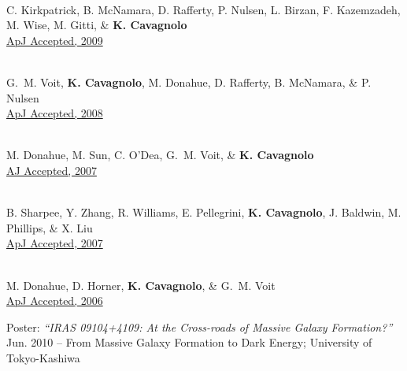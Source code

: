 \documentclass[12pt]{cv}
\begin{document}
\begin{llist}
{}\\
C. Kirkpatrick, B. McNamara, D. Rafferty, P. Nulsen, L. Birzan, F. Kazemzadeh, M. Wise, M. Gitti, \& {\bf K. Cavagnolo}\\
\href{http://adsabs.harvard.edu/abs/2009ApJ...697..867K}{ApJ Accepted, 2009}

{}\\
G.~M. Voit, {\bf K. Cavagnolo}, M. Donahue, D. Rafferty, B. McNamara, \& P. Nulsen\\
\href{http://adsabs.harvard.edu/abs/2008ApJ...681L...5V}{ApJ Accepted, 2008}

{}\\
M. Donahue, M. Sun, C. O'Dea, G.~M. Voit, \& {\bf K. Cavagnolo}\\
\href{http://adsabs.harvard.edu/abs/2007AJ....134...14D}{AJ Accepted, 2007}

{}\\
B. Sharpee, Y. Zhang, R. Williams, E. Pellegrini, {\bf K. Cavagnolo}, J. Baldwin, M. Phillips, \& X. Liu\\
\href{http://adsabs.harvard.edu/abs/2007ApJ...659.1265S}{ApJ Accepted, 2007}

{}\\
M. Donahue, D. Horner, {\bf K. Cavagnolo}, \& G.~M. Voit\\
\href{http://adsabs.harvard.edu/abs/2006ApJ...643..730D}{ApJ Accepted, 2006}




{\sc Poster: {\textit{``IRAS 09104+4109: At the Cross-roads of Massive Galaxy Formation?''}}}\\
Jun. 2010 -- From Massive Galaxy Formation to Dark Energy; University of Tokyo-Kashiwa


\end{llist}
\end{document}
